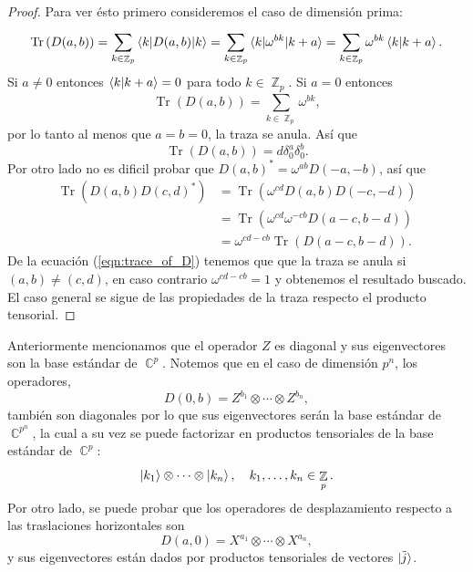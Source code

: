 \documentclass[a4paper]{report}
\DeclareMathOperator{\C}{\mathbb{C}}
\DeclareMathOperator{\Z}{\mathbb{Z}}
\DeclareMathOperator{\Tr}{Tr}
\begin{document}
  \begin{proof}
    Para ver ésto primero consideremos el caso de dimensión
    prima: 
    \begin{equation}
      \Tr\left( D(a,b) \right) 
      = \sum_{k \in \Z_p}^{} \braket{k|D(a,b)|k} 
      = \sum_{k \in \Z_p}^{} \braket{k|\omega^{bk}|k+a} 
      = \sum_{k \in \Z_p}^{} \omega^{bk} \braket{k|k+a}.
    \end{equation}
    Si $a \neq 0$ entonces $\braket{k|k+a} = 0$ para todo $k
    \in \Z_p$. Si $a = 0$ entonces 
    \[
      \Tr\left( D(a,b) \right) 
      = \sum_{k \in \Z_p}^{} \omega^{bk},
    \] 
    por lo tanto al menos que $a = b = 0$, la traza se
    anula.  Así que
    \begin{equation}
      \label{eqn:trace_of_D}
      \Tr\left( D(a,b) \right) 
      = d \delta^a_0 \delta^b_0.
    \end{equation} 
    Por otro lado no es dificil probar que $D(a,b)^{*} =
    \omega^{ab} D(-a,-b)$, así que 
    \begin{align}
      \Tr\left( D(a,b)D(c,d)^{*} \right) 
      &= \Tr\left( \omega^{cd} D(a,b) D(-c,-d) \right) \\
      &= \Tr\left( \omega^{cd} \omega^{-c b} D(a-c, b-d)
      \right) \\
      &= \omega^{cd-c b} \Tr(D(a-c,b-d)).
    \end{align} 
    De la ecuación (\ref{eqn:trace_of_D}) tenemos que que la
    traza se anula si $(a,b) \neq (c,d)$, en caso contrario
    $\omega^{cd-c b} = 1$ y obtenemos el resultado buscado.
    El caso general se sigue de las propiedades de la traza
    respecto el producto tensorial.
  \end{proof}

  Anteriormente mencionamos que el operador $Z$ es diagonal
  y sus eigenvectores son la base estándar de $\C^{p}$.
  Notemos que en el caso de dimensión $p^{n}$, los
  operadores, 
  \[
    D(0,b) = Z^{b_1} \otimes \cdots \otimes Z^{b_n},
  \] 
  también son diagonales por lo que sus eigenvectores serán
  la base estándar de $\C^{p^{n}}$, la cual a su vez se
  puede factorizar en productos tensoriales de la base
  estándar de $\C^{p}$:
  \[
    \ket{k_1} \otimes \cdots \otimes \ket{k_n},
    \quad k_1,\ldots,k_n \in \Z_p.
  \] 
  Por otro lado, se puede probar que los operadores de
  desplazamiento respecto a las traslaciones horizontales
  son
  \[
    D(a,0) = X^{a_1} \otimes \cdots \otimes X^{a_n},
  \] 
  y sus eigenvectores están dados por productos tensoriales
  de vectores $\ket{\tilde j}$.
\end{document}
